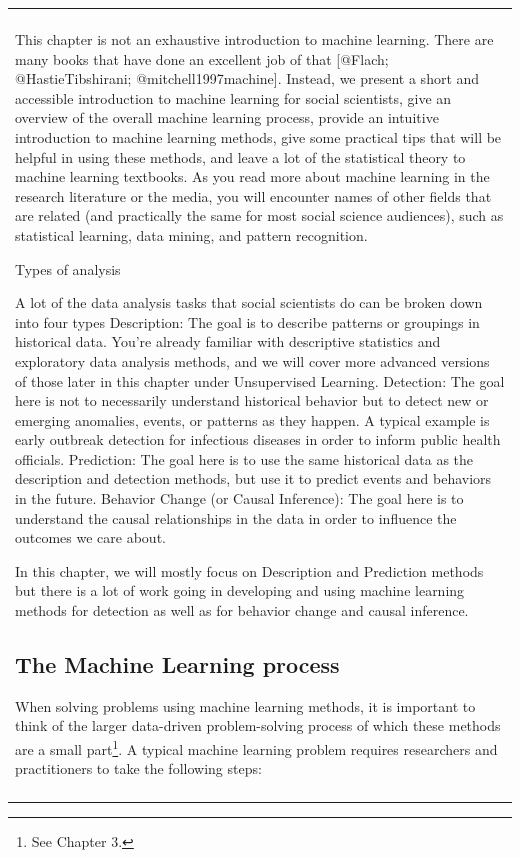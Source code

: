 \documentclass[]{krantz}
\newenvironment{F00}
    {\begin{center}
    \begin{tabular}{|p{0.9\textwidth}|}
    \hline\\
    }
    { 
    \\\\\hline
    \end{tabular} 
    \end{center}
    }
\begin{document}
\begin{F00}
This chapter is not an exhaustive introduction to machine learning.
There are many books that have done an excellent job of that {[}@Flach;
@HastieTibshirani; @mitchell1997machine{]}. Instead, we present a short
and accessible introduction to machine learning for social scientists,
give an overview of the overall machine learning process, provide an
intuitive introduction to machine learning methods, give some practical
tips that will be helpful in using these methods, and leave a lot of the
statistical theory to machine learning textbooks. As you read more about
machine learning in the research literature or the media, you will
encounter names of other fields that are related (and practically the
same for most social science audiences), such as statistical learning,
data mining, and pattern recognition.

Types of analysis

A lot of the data analysis tasks that social scientists do can be broken
down into four types Description: The goal is to describe patterns or
groupings in historical data. You're already familiar with descriptive
statistics and exploratory data analysis methods, and we will cover more
advanced versions of those later in this chapter under Unsupervised
Learning. Detection: The goal here is not to necessarily understand
historical behavior but to detect new or emerging anomalies, events, or
patterns as they happen. A typical example is early outbreak detection
for infectious diseases in order to inform public health officials.
Prediction: The goal here is to use the same historical data as the
description and detection methods, but use it to predict events and
behaviors in the future. Behavior Change (or Causal Inference): The goal
here is to understand the causal relationships in the data in order to
influence the outcomes we care about.

In this chapter, we will mostly focus on Description and Prediction
methods but there is a lot of work going in developing and using machine
learning methods for detection as well as for behavior change and causal
inference.

\subsection{The Machine Learning
process}\label{the-machine-learning-process}

When solving problems using machine learning methods, it is important to
think of the larger data-driven problem-solving process of which these
methods are a small part\footnote{See Chapter 3.}. A typical machine
learning problem requires researchers and practitioners to take the
following steps:


\end{F00}
\end{document}

